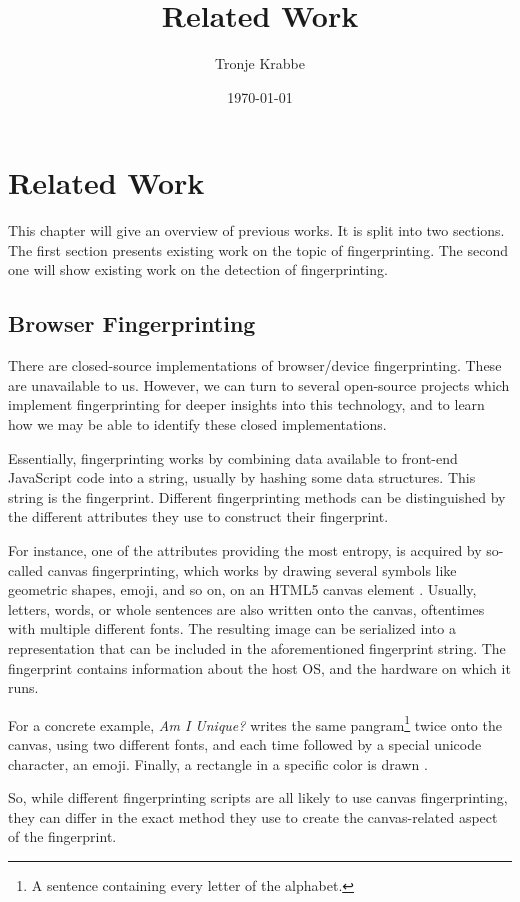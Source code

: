\documentclass[
    fontsize=12pt,
    headings=small,
    parskip=half,
    bibliography=totoc,
    numbers=noenddot,
    open=any
]{scrreprt}
\title{Related Work}
\author{Tronje Krabbe}
\date{\today}
\begin{document}
\hypersetup{hidelinks}

\setcounter{tocdepth}{1}
\tableofcontents

\chapter{Related Work}
This chapter will give an overview of previous works. It is split into two sections.
The first section presents existing work on the topic of fingerprinting. The second one will show existing work on
the detection of fingerprinting.

\section{Browser Fingerprinting}
There are closed-source implementations of browser/device fingerprinting. These are unavailable to us.
However, we can turn to several open-source projects which implement fingerprinting for deeper insights into this technology,
and to learn how we may be able to identify these closed implementations.

Essentially, fingerprinting works by combining data available to front-end JavaScript code into a string,
usually by hashing some data structures. This string is the fingerprint.
Different fingerprinting methods can be distinguished by the different attributes they use to construct their fingerprint.

For instance, one of the attributes providing the most entropy, is acquired by so-called canvas fingerprinting, which works by drawing
several symbols like geometric shapes, emoji, and so on, on an HTML5 canvas element \cite{laperdrix2016beauty}.
Usually, letters, words, or whole sentences are also written onto the canvas, oftentimes with multiple different fonts.
The resulting image can be serialized into a representation that can be included in the aforementioned fingerprint string.
The fingerprint contains information about the host OS, and the hardware on which it runs.

For a concrete example, \textit{Am I Unique?} writes the same pangram\footnote{A sentence containing every letter of the alphabet.}
twice onto the canvas, using two different fonts, and each time followed by a special unicode character, an emoji.
Finally, a rectangle in a specific color is drawn \cite{laperdrix2016beauty}.

So, while different fingerprinting scripts are all likely to use canvas fingerprinting, they can differ in the exact
method they use to create the canvas-related aspect of the fingerprint.
\end{document}
